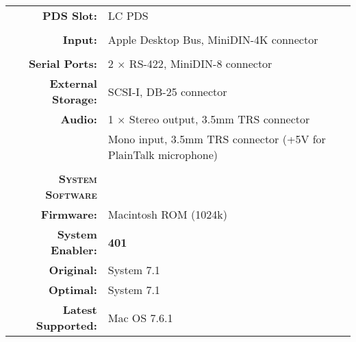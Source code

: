 \begin{tabular}{ r p{6in} }
\textbf{PDS Slot:} & LC PDS \\
\\
\textbf{Input:} & Apple Desktop Bus, MiniDIN-4K connector \\
\\
\textbf{Serial Ports:} & 2 \(\times\) RS-422, MiniDIN-8 connector \\
\textbf{External Storage:} & SCSI-I, DB-25 connector \\
\textbf{Audio:} & 1 \(\times\) Stereo output, 3.5mm TRS connector \\
~ & Mono input, 3.5mm TRS connector (+5V for PlainTalk microphone) \\
\\
\textbf{\textsc{System Software}} & ~ \\
\textbf{Firmware:} & Macintosh ROM (1024k) \\
\textbf{System Enabler:} & \textbf{401} \\
\textbf{Original:} & System 7.1 \\
\textbf{Optimal:} & System 7.1 \\
\textbf{Latest Supported:} & Mac OS 7.6.1 \\
\end{tabular}
